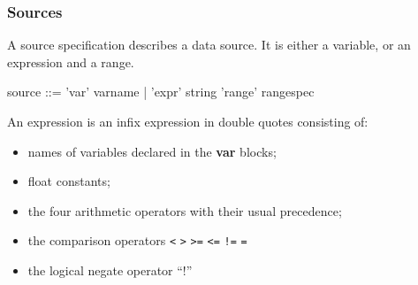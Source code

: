 \subsubsection{Sources}
A source specification describes a data source. It is either a
variable, or an expression and a range.
\begin{v}
source      ::= 'var' varname
            |   'expr' string 'range' rangespec
\end{v}
An expression is an infix expression in double quotes consisting of:
\begin{itemize}
\item names of variables declared in the \textbf{var} blocks;
\item float constants;
\item the four arithmetic operators with their usual precedence;
\item the comparison operators \verb+<+ \verb+>+ \verb+>=+ \verb+<=+ 
\verb+!=+ \verb+=+
\item the logical negate operator ``!''
\end{itemize}


